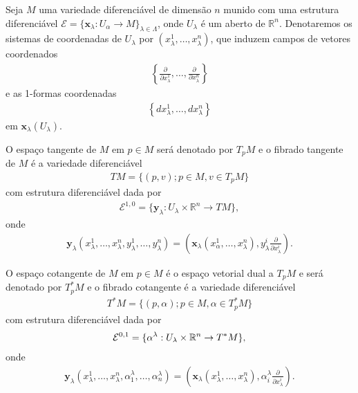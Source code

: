 \documentclass[10pt,reqno]{amsart}
\begin{document}
Seja $M$ uma variedade diferenciável de dimensão $n$ munido com uma estrutura diferenciável $\mathcal E=\{\mathbf x_\lambda:U_\alpha \rightarrow M\}_{\lambda \in \Lambda}$, onde $U_\lambda$ é um aberto de $\mathbb R^n$.
Denotaremos os sistemas de coordenadas de $U_\lambda$ por $(x^1_\lambda, \ldots, x^n_\lambda)$, que induzem campos de vetores coordenados 
\begin{align*}
\left\{ \frac{\partial}{\partial x^1_\lambda}, \ldots, \frac{\partial}{\partial x^n_\lambda} \right\}
\end{align*}
e as 1-formas coordenadas
\begin{align*}
\left\{ dx^1_\lambda, \ldots, dx^n_\lambda \right\}
\end{align*}
em $\mathbf x_\lambda (U_\lambda)$.

O espaço tangente de $M$ em $p\in M$ será denotado por $T_pM$ e o fibrado tangente de $M$ é a variedade diferenciável 
\begin{align*}
TM = \{(p,v);p\in M,v\in T_pM\}
\end{align*}
com estrutura diferenciável dada por 
\begin{align*}
\mathcal E^{1,0}=\{\mathbf y_\lambda:U_\lambda \times \mathbb R^n \rightarrow TM\},
\end{align*}
onde 
\begin{align*}
\mathbf y_\lambda (x^1_\lambda, \ldots, x^n_\lambda, y_\lambda^1, \ldots, y_\lambda^n) = \left( \mathbf x_\lambda(x^1_\alpha, \ldots, x^n_\lambda),  y^i_\lambda \frac{\partial}{\partial x^i_\lambda} \right).
\end{align*}

O espaço cotangente de $M$ em $p\in M$ é o espaço vetorial dual a $T_pM$ e será denotado por $T_p^\ast M$ e o fibrado cotangente é a variedade diferenciável 
\begin{align*}
T^\ast M = \{(p,\alpha);p\in M,\alpha \in T_p^\ast M\}
\end{align*}
com estrutura diferenciável dada por
\begin{align*}
\mathcal E^{0,1}=\{\bold{\alpha} ^\lambda:U_\lambda \times \mathbb R^n \rightarrow T^\ast M\},
\end{align*}
onde 
\begin{align*}
\mathbf y_\lambda (x^1_\lambda, \ldots, x^n_\lambda, \alpha^\lambda_1, \ldots, \alpha^\lambda_n) = \left( \mathbf x_\lambda(x^1_\lambda, \ldots, x^n_\lambda),  \alpha^\lambda_i\frac{\partial}{\partial x^i_\lambda} \right).
\end{align*}
\end{document}
